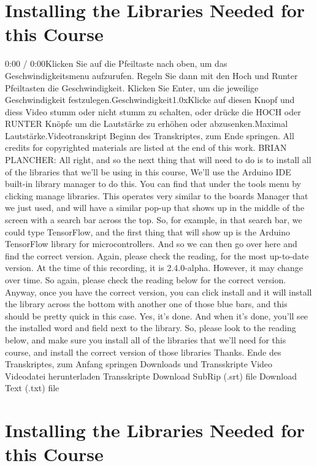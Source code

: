 \section{Installing the Libraries Needed for this Course}

    0:00 / 0:00Klicken Sie auf die Pfeiltaste nach oben, um das Geschwindigkeitsmenu aufzurufen. Regeln Sie dann mit den Hoch und Runter Pfeiltasten die Geschwindigkeit. Klicken Sie Enter, um die jeweilige Geschwindigkeit festzulegen.Geschwindigkeit1.0xKlicke auf diesen Knopf und diess Video stumm oder nicht stumm zu schalten, oder drücke die HOCH oder RUNTER Knöpfe um die Lautstärke zu erhöhen oder abzusenken.Maximal Lautstärke.Videotranskript
    Beginn des Transkriptes, zum Ende springen.
    All credits for copyrighted materials are listed at the end of this work.
    BRIAN PLANCHER: All right, and so the next thing that will need to do
    is to install all of the libraries that we'll be using in this course,
    We'll use the Arduino IDE built-in library manager to do this.
    You can find that under the tools menu by clicking manage libraries.
    This operates very similar to the boards Manager
    that we just used, and will have a similar pop-up that
    shows up in the middle of the screen with a search bar across the top.
    So, for example, in that search bar, we could type TensorFlow,
    and the first thing that will show up is the Arduino TensorFlow
    library for microcontrollers.
    And so we can then go over here and find the correct version.
    Again, please check the reading, for the most up-to-date version.
    At the time of this recording, it is 2.4.0-alpha.
    However, it may change over time.
    So again, please check the reading below for the correct version.
    Anyway, once you have the correct version, you can click install
    and it will install the library across the bottom
    with another one of those blue bars, and this
    should be pretty quick in this case.
    Yes, it's done.
    And when it's done, you'll see the installed word and field
    next to the library.
    So, please look to the reading below, and make
    sure you install all of the libraries that we'll need for this course,
    and install the correct version of those libraries Thanks.
    Ende des Transkriptes, zum Anfang springen
    Downloads und Transskripte
    Video
    Videodatei herunterladen
    Transskripte
    Download SubRip (.srt) file
    Download Text (.txt) file

\section{Installing the Libraries Needed for this Course}

